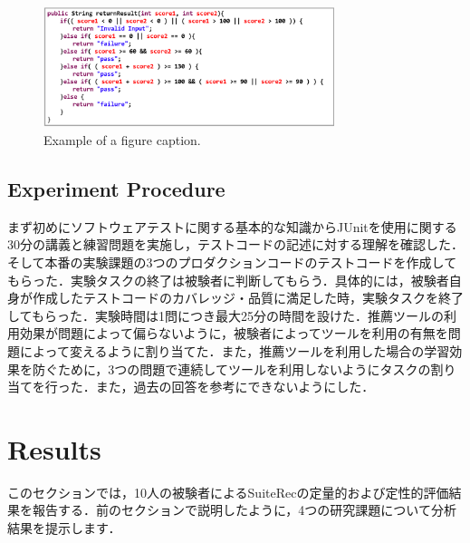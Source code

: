 \documentclass[conference]{IEEEtran}
\begin{document}
\begin{figure}[htbp]
\centerline{\includegraphics[width=8.5cm]{src.pdf}}
\caption{Example of a figure caption.}
\label{fig}
\end{figure}

\subsection{Experiment Procedure}
まず初めにソフトウェアテストに関する基本的な知識からJUnitを使用に関する30分の講義と練習問題を実施し，テストコードの記述に対する理解を確認した．そして本番の実験課題の3つのプロダクションコードのテストコードを作成してもらった．実験タスクの終了は被験者に判断してもらう．具体的には，被験者自身が作成したテストコードのカバレッジ・品質に満足した時，実験タスクを終了してもらった．実験時間は1問につき最大25分の時間を設けた．推薦ツールの利用効果が問題によって偏らないように，被験者によってツールを利用の有無を問題によって変えるように割り当てた．また，推薦ツールを利用した場合の学習効果を防ぐために，3つの問題で連続してツールを利用しないようにタスクの割り当てを行った．また，過去の回答を参考にできないようにした．

\section{Results}

このセクションでは，10人の被験者によるSuiteRecの定量的および定性的評価結果を報告する．前のセクションで説明したように，4つの研究課題について分析結果を提示します．
\end{document}
